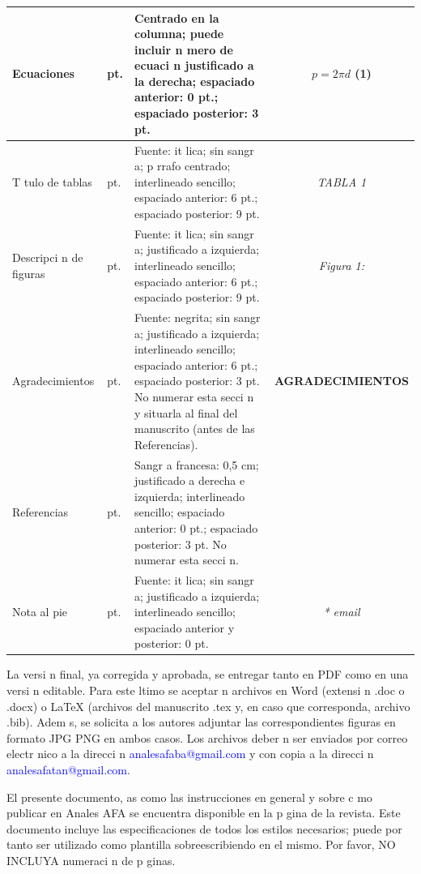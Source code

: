 \documentclass{article}
\begin{document}
\begin{table}[ht]
\begin{tabular}{|m{2cm}|m{1.5cm}|m{7.8cm}|c|}
    \hline
    \centering Ecuaciones & \centering 10 pt.  &  Centrado en la columna; puede incluir n mero de ecuaci n justificado a la derecha; espaciado anterior: 0 pt.; espaciado posterior: 3 pt.  &  $p= 2\pi d$ \hspace{0.5cm}  (1)  \\
    \hline
    \centering T tulo de tablas  & \centering 10 pt.  & Fuente: it lica; sin sangr a; p rrafo centrado; interlineado sencillo; espaciado anterior: 6 pt.; espaciado posterior: 9 pt.  &  \textit{TABLA 1}  \\
    \hline
    \centering Descripci n de figuras  & \centering 9 pt.  &  Fuente: it lica; sin sangr a; justificado a izquierda; interlineado sencillo; espaciado anterior: 6 pt.; espaciado posterior: 9 pt.  &  \textit{Figura 1:}  \\
    \hline
    \centering Agradecimientos & \centering 10 pt. &  Fuente: negrita; sin sangr a; justificado a izquierda; interlineado sencillo; espaciado anterior: 6 pt.; espaciado posterior: 3 pt. No numerar  esta secci n y situarla al final del manuscrito (antes de las Referencias). &  \textbf{AGRADECIMIENTOS}\\
    \hline
    \centering Referencias & \centering 9 pt. & Sangr a francesa: 0,5 cm; justificado a derecha e izquierda; interlineado sencillo; espaciado anterior: 0 pt.; espaciado posterior: 3 pt. No numerar esta secci n.   &    \\
    \hline
    \centering Nota al pie  &  \centering 9 pt.  & Fuente: it lica; sin sangr a; justificado a izquierda; interlineado sencillo; espaciado anterior y posterior: 0 pt.  &  \small{\textit{* email}}   \\
    \hline
    \end{tabular}
\end{table}

\normalsize

La versi n final, ya corregida y aprobada, se entregar  tanto en PDF como en una versi n editable. Para este  ltimo se aceptar n archivos en Word (extensi n .doc o .docx) o \LaTeX{ }  (archivos del manuscrito .tex y, en caso que corresponda, archivo .bib). Adem s, se solicita a los autores adjuntar las correspondientes figuras en formato JPG   PNG en ambos casos. Los archivos deber n ser enviados por correo electr nico a la direcci n \textcolor{blue}{analesafaba@gmail.com}  y con copia a la direcci n \textcolor{blue}{analesafatan@gmail.com}.

El presente documento, as  como las instrucciones en general y sobre c mo publicar en Anales AFA se encuentra disponible en la p gina de la revista. Este documento incluye las especificaciones de todos los estilos necesarios; puede por tanto ser utilizado como plantilla sobreescribiendo en el mismo. Por favor, NO INCLUYA numeraci n de p ginas.
\end{document}
